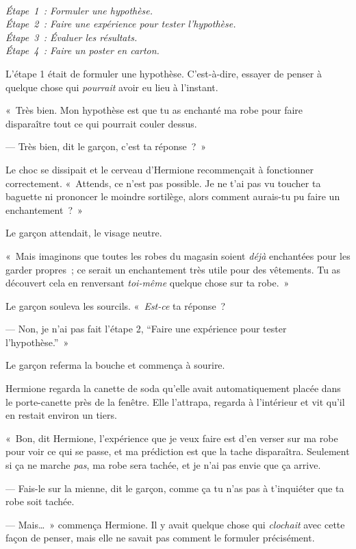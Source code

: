 \emph{\\
Étape~1~: Formuler une hypothèse.\\
Étape~2~: Faire une expérience pour tester l'hypothèse.\\
Étape~3~: Évaluer les résultats.\\
Étape~4~: Faire un poster en carton.\\
}

L'étape 1 était de formuler une hypothèse.
C'est-à-dire, essayer de penser à quelque chose qui \emph{pourrait} avoir eu lieu à l'instant.

«~Très bien. Mon hypothèse est que tu as enchanté ma robe pour faire disparaître tout ce qui pourrait couler dessus.

--- Très bien, dit le garçon, c'est ta réponse~?~»

Le choc se dissipait et le cerveau d'Hermione recommençait à fonctionner correctement.
«~Attends, ce n'est pas possible.
Je ne t'ai pas vu toucher ta baguette ni prononcer le moindre sortilège, alors comment aurais-tu pu faire un enchantement~?~»

Le garçon attendait, le visage neutre.

«~Mais imaginons que toutes les robes du magasin soient \emph{déjà} enchantées pour les garder propres~; ce serait un enchantement très utile pour des vêtements.
Tu as découvert cela en renversant \emph{toi-même} quelque chose sur ta robe.~»

Le garçon souleva les sourcils.
«~\emph{Est-ce} ta réponse~?

--- Non, je n'ai pas fait l'étape 2, “Faire une expérience pour tester l'hypothèse.”~»

Le garçon referma la bouche et commença à sourire.

Hermione regarda la canette de soda qu'elle avait automatiquement placée dans le porte-canette près de la fenêtre.
Elle l'attrapa, regarda à l'intérieur et vit qu'il en restait environ un tiers.

«~Bon, dit Hermione, l'expérience que je veux faire est d'en verser sur ma robe pour voir ce qui se passe, et ma prédiction est que la tache disparaîtra.
Seulement si ça ne marche \emph{pas}, ma robe sera tachée, et je n'ai pas envie que ça arrive.

--- Fais-le sur la mienne, dit le garçon, comme ça tu n'as pas à t'inquiéter que ta robe soit tachée.

--- Mais…~» commença Hermione. Il y avait quelque chose qui \emph{clochait} avec cette façon de penser, mais elle ne savait pas comment le formuler précisément.

